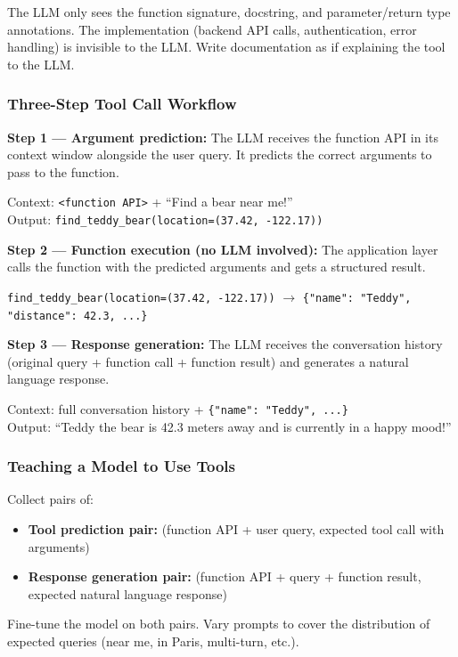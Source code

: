 \documentclass[11pt, a4paper]{article}
\begin{document}
\begin{warnbox}
The LLM only sees the function signature, docstring, and parameter/return type annotations. The implementation (backend API calls, authentication, error handling) is invisible to the LLM. Write documentation as if explaining the tool to the LLM.
\end{warnbox}

\subsubsection{Three-Step Tool Call Workflow}

\begin{exbox}
\textbf{Step 1 --- Argument prediction:} The LLM receives the function API in its context window alongside the user query. It predicts the correct arguments to pass to the function.

Context: \texttt{<function API>} + ``Find a bear near me!''\\
Output: \texttt{find\_teddy\_bear(location=(37.42, -122.17))}

\textbf{Step 2 --- Function execution (no LLM involved):} The application layer calls the function with the predicted arguments and gets a structured result.

\texttt{find\_teddy\_bear(location=(37.42, -122.17))} $\to$ \texttt{\{"name": "Teddy", "distance": 42.3, ...\}}

\textbf{Step 3 --- Response generation:} The LLM receives the conversation history (original query + function call + function result) and generates a natural language response.

Context: full conversation history + \texttt{\{"name": "Teddy", ...\}}\\
Output: ``Teddy the bear is 42.3 meters away and is currently in a happy mood!''
\end{exbox}

\subsubsection{Teaching a Model to Use Tools}

\begin{defbox}
Collect pairs of:
\begin{itemize}[leftmargin=1.5em]
  \item \textbf{Tool prediction pair:} (function API + user query, expected tool call with arguments)
  \item \textbf{Response generation pair:} (function API + query + function result, expected natural language response)
\end{itemize}
Fine-tune the model on both pairs. Vary prompts to cover the distribution of expected queries (near me, in Paris, multi-turn, etc.).
\end{defbox}
\end{document}
